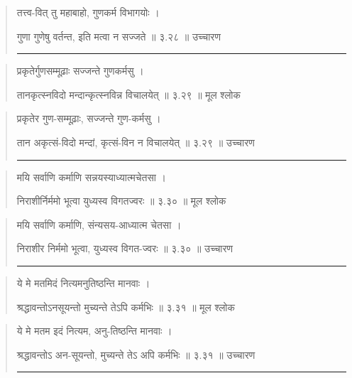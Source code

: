 \begin{quotation}

तत्त्व-वित् तु महाबाहो, गुणकर्म विभागयोः  ।  

गुणा गुणेषु वर्तन्त, इति मत्वा न सज्जते  ॥ ३.२८ ॥  उच्चारण

\noindent\rule{16cm}{0.4pt} 
\end{quotation}


\begin{quotation}

प्रकृतेर्गुणसम्मूढ़ाः सज्जन्ते गुणकर्मसु  ।  

तानकृत्स्नविदो मन्दान्कृत्स्नविन्न विचालयेत्‌  ॥ ३.२९ ॥  मूल श्लोक
\end{quotation}

\begin{quotation}
प्रकृतेर  गुण-सम्मूढ़ाः, सज्जन्ते गुण-कर्मसु  ।  

तान अकृत्सं-विदो मन्दां, कृत्सं-विन न विचालयेत्‌  ॥ ३.२९ ॥  उच्चारण

\noindent\rule{16cm}{0.4pt} 
\end{quotation}


\begin{quotation}

मयि सर्वाणि कर्माणि सन्नयस्याध्यात्मचेतसा  ।  

निराशीर्निर्ममो भूत्वा युध्यस्व विगतज्वरः  ॥ ३.३० ॥  मूल श्लोक
\end{quotation}

\begin{quotation}

मयि सर्वाणि कर्माणि, संन्यसय-आध्यात्म चेतसा  ।  

निराशीर निर्ममो भूत्वा, युध्यस्व विगत-ज्वरः  ॥ ३.३० ॥  उच्चारण

\noindent\rule{16cm}{0.4pt} 
\end{quotation}


\begin{quotation}

ये मे मतमिदं नित्यमनुतिष्ठन्ति मानवाः  ।  

श्रद्धावन्तोऽनसूयन्तो मुच्यन्ते तेऽपि कर्मभिः  ॥ ३.३१ ॥  मूल श्लोक
\end{quotation}

\begin{quotation}

ये मे मतम इदं नित्यम, अनु-तिष्ठन्ति मानवाः  ।  

श्रद्धावन्तोऽ अन-सूयन्तो, मुच्यन्ते तेऽ अपि कर्मभिः  ॥ ३.३१ ॥  उच्चारण

\noindent\rule{16cm}{0.4pt} 
\end{quotation}


